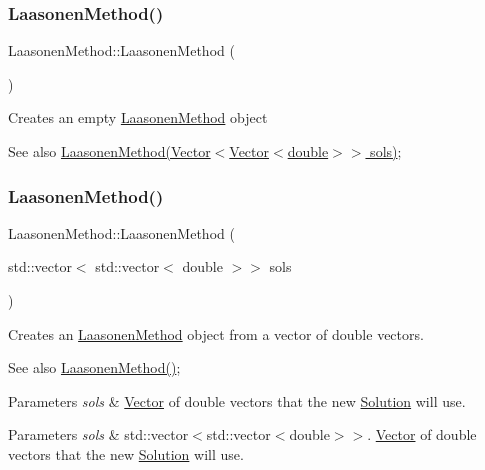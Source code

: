\subsubsection{\texorpdfstring{Laasonen\+Method()}{LaasonenMethod()}\hspace{0.1cm}{\footnotesize\ttfamily [1/2]}}
{\footnotesize\ttfamily Laasonen\+Method\+::\+Laasonen\+Method (\begin{DoxyParamCaption}{ }\end{DoxyParamCaption})}

Creates an empty \hyperlink{class_laasonen_method}{Laasonen\+Method} object \begin{DoxySeeAlso}{See also}
\hyperlink{class_laasonen_method}{Laasonen\+Method(\+Vector$<$\+Vector$<$double$>$$>$ sols)}; 
\end{DoxySeeAlso}
\mbox{\label{class_laasonen_method_a55dc0b88c2298a492d186564b9baed26}} 
\subsubsection{\texorpdfstring{Laasonen\+Method()}{LaasonenMethod()}\hspace{0.1cm}{\footnotesize\ttfamily [2/2]}}
{\footnotesize\ttfamily Laasonen\+Method\+::\+Laasonen\+Method (\begin{DoxyParamCaption}\item[{std\+::vector$<$ std\+::vector$<$ double $>$$>$}]{sols }\end{DoxyParamCaption})}

Creates an \hyperlink{class_laasonen_method}{Laasonen\+Method} object from a vector of double vectors. \begin{DoxySeeAlso}{See also}
\hyperlink{class_laasonen_method_a1bff2dc73fc66c3070fc7a187ff556f9}{Laasonen\+Method()}; 
\end{DoxySeeAlso}

\begin{DoxyParams}{Parameters}
{\em sols} & \hyperlink{class_vector}{Vector} of double vectors that the new \hyperlink{class_solution}{Solution} will use. \\
\hline
\end{DoxyParams}

\begin{DoxyParams}{Parameters}
{\em sols} & std\+::vector$<$std\+::vector$<$double$>$$>$. \hyperlink{class_vector}{Vector} of double vectors that the new \hyperlink{class_solution}{Solution} will use. \\
\hline
\end{DoxyParams}



